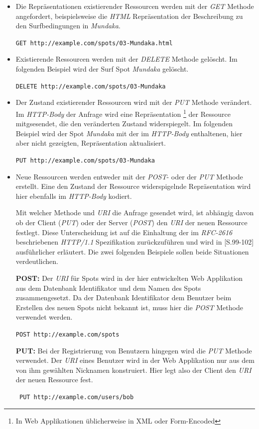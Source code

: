 \begin{itemize}
\item Die Repräsentationen existierender Ressourcen werden mit der
  \textit{GET} Methode angefordert, beispielsweise die \textit{HTML}
  Repräsentation der Beschreibung zu den Surfbedingungen in
  \textit{Mundaka}.

  \texttt{GET http://example.com/spots/03-Mundaka.html}

\item Existierende Ressourcen werden mit der \textit{DELETE} Methode
  gelöscht. Im folgenden Beispiel wird der Surf Spot \textit{Mundaka}
  gelöscht.

  \texttt{DELETE http://example.com/spots/03-Mundaka}

\item Der Zustand existierender Ressourcen wird mit der \textit{PUT}
  Methode verändert. Im \textit{HTTP-Body} der Anfrage wird eine
  Repräsentation \footnote{In Web Applikationen üblicherweise in XML
    oder Form-Encoded} der Ressource mitgsesendet, die den veränderten
  Zustand widerspiegelt. Im folgenden Beispiel wird der Spot
  \textit{Mundaka} mit der im \textit{HTTP-Body} enthaltenen, hier
  aber nicht gezeigten, Repräsentation aktualisiert.

  \texttt{PUT http://example.com/spots/03-Mundaka}

\item Neue Ressourcen werden entweder mit der \textit{POST}- oder der
  \textit{PUT} Methode erstellt. Eine den Zustand der Ressource
  widerspigelnde Repräsentation wird hier ebenfalls im
  \textit{HTTP-Body} kodiert.
  
  Mit welcher Methode und \textit{URI} die Anfrage gesendet wird, ist
  abhängig davon ob der Client (\textit{PUT}) oder der Server
  (\textit{POST}) den \textit{URI} der neuen Ressource festlegt. Diese
  Unterscheidung ist auf die Einhaltung der im \textit{RFC-2616}
   beschriebenen
  \textit{HTTP/1.1} Spezifikation zurückzuführen und wird in
  \cite{Richardson07}[S.99-102] ausführlicher erläutert. Die zwei
  folgenden Beispiele sollen beide Situationen verdeutlichen.

  \textbf{POST:} Der \textit{URI} für Spots wird in der hier
  entwickelten Web Applikation aus dem Datenbank Identifikator und dem
  Namen des Spots zusammengesetzt. Da der Datenbank Identifikator dem
  Benutzer beim Erstellen des neuen Spots nicht bekannt ist, muss hier
  die \textit{POST} Methode verwendet werden.

  \texttt{POST http://example.com/spots}

  \textbf{PUT:} Bei der Registrierung von Benutzern hingegen wird die
  \textit{PUT} Methode verwendet. Der \textit{URI} eines Benutzer wird
  in der Web Applikation nur aus dem von ihm gewählten Nicknamen
  konstruiert. Hier legt also der Client den \textit{URI} der neuen
  Ressource fest.

  \texttt{ PUT http://example.com/users/bob}

\end{itemize}

